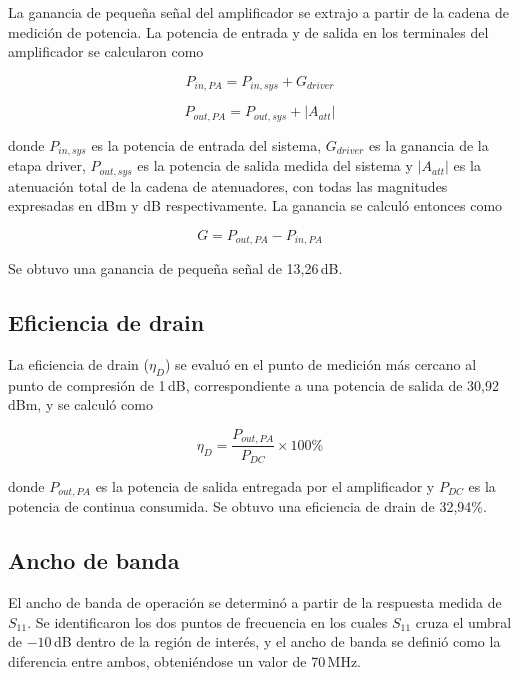 La ganancia de pequeña señal del amplificador se extrajo a partir de la cadena de medición de potencia. La potencia de entrada y de salida en los terminales del amplificador se calcularon como

\begin{equation}
P_{in,PA} = P_{in,sys} + G_{driver}
\label{eq:pin_pa}
\end{equation}

\begin{equation}
P_{out,PA} = P_{out,sys} + |A_{att}|
\label{eq:pout_pa}
\end{equation}

donde $P_{in,sys}$ es la potencia de entrada del sistema, $G_{driver}$ es la ganancia de la etapa driver, $P_{out,sys}$ es la potencia de salida medida del sistema y $|A_{att}|$ es la atenuación total de la cadena de atenuadores, con todas las magnitudes expresadas en dBm y dB respectivamente. La ganancia se calculó entonces como

\begin{equation}
G = P_{out,PA} - P_{in,PA}
\label{eq:gain_calc}
\end{equation}

Se obtuvo una ganancia de pequeña señal de 13{,}26\,dB.

\subsection{Eficiencia de drain}
La eficiencia de drain ($\eta_D$) se evaluó en el punto de medición más cercano al punto de compresión de 1\,dB, correspondiente a una potencia de salida de 30{,}92\,dBm, y se calculó como

\begin{equation}
\eta_D = \frac{P_{out,PA}}{P_{DC}} \times 100\%
\label{eq:drain_eff}
\end{equation}

donde $P_{out,PA}$ es la potencia de salida entregada por el amplificador y $P_{DC}$ es la potencia de continua consumida. Se obtuvo una eficiencia de drain de 32{,}94\%.

\subsection{Ancho de banda}
El ancho de banda de operación se determinó a partir de la respuesta medida de $S_{11}$. Se identificaron los dos puntos de frecuencia en los cuales $S_{11}$ cruza el umbral de $-10$\,dB dentro de la región de interés, y el ancho de banda se definió como la diferencia entre ambos, obteniéndose un valor de 70\,MHz.

